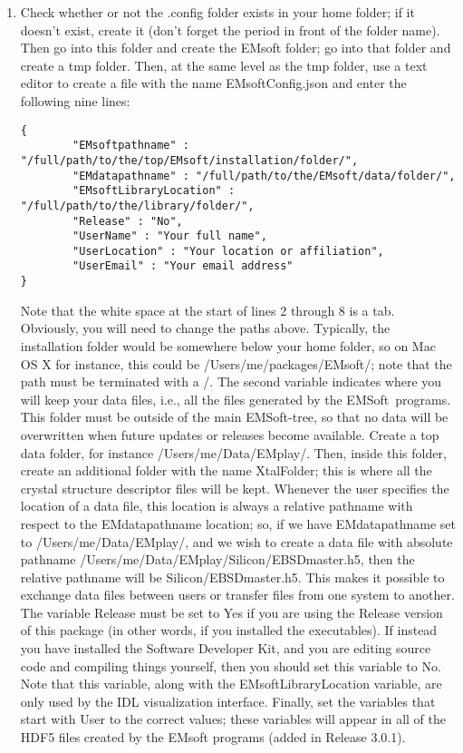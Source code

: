 \documentclass[DIV=calc, paper=letter, fontsize=11pt]{scrartcl}	 %
\newcommand{\ctp}{\textsf{EMSoft}}
\begin{document}
\begin{enumerate}
\item Check whether or not the \textsf{.config} folder exists in your home folder; if it doesn't exist, create it (don't forget the 
period in front of the folder name). Then go into this folder and create the \textsf{EMsoft} folder; go into
that folder and create a \textsf{tmp} folder.  Then, at the same level as the tmp folder, use a text editor to
create a file with the name \textsf{EMsoftConfig.json} and enter the following nine lines:
\begin{verbatim}
{
        "EMsoftpathname" : "/full/path/to/the/top/EMsoft/installation/folder/",
        "EMdatapathname" : "/full/path/to/the/EMsoft/data/folder/",
        "EMsoftLibraryLocation" : "/full/path/to/the/library/folder/",
        "Release" : "No",
        "UserName" : "Your full name",
        "UserLocation" : "Your location or affiliation",
        "UserEmail" : "Your email address"
}
\end{verbatim}
Note that the white space at the start of lines 2 through 8 is a tab.  Obviously, you will need to change the paths above.
Typically, the installation folder would be somewhere below your home folder, so on Mac OS X for instance, this 
could be \textsf{/Users/me/packages/EMsoft/};  note that the path must be terminated with a \textsf{/}.
The second variable indicates where you will keep your data files, i.e., all the files generated by the \ctp\ programs.
This folder must be outside of the main \ctp-tree, so that no data will be overwritten when future updates or releases
become available.  Create a top data folder, for instance \textsf{/Users/me/Data/EMplay/}.  Then, inside this folder,
create an additional folder with the name \textsf{XtalFolder}; this is where all the crystal structure descriptor files 
will be kept.  Whenever the user specifies the location of a data file, this location is always a relative pathname
with respect to the \textsf{EMdatapathname} location;  so, if we have \textsf{EMdatapathname} set to \textsf{/Users/me/Data/EMplay/},
and we wish to create a data file with absolute pathname \textsf{/Users/me/Data/EMplay/Silicon/EBSDmaster.h5}, then
the relative pathname will be \textsf{Silicon/EBSDmaster.h5}.  This makes it possible to exchange data files 
between users or transfer files from one system to another.  The variable \textsf{Release} must be set to \textsf{Yes} if you are 
using the Release version of this package (in other words, if you installed the executables).  If instead you have installed the 
Software Developer Kit, and you are editing source code and compiling things yourself, then you should set this variable to \textsf{No}.  Note that this variable,
along with the \textsf{EMsoftLibraryLocation} variable,  are only used by the IDL visualization interface.  
Finally, set the variables that start with \textsf{User} to the correct values; these 
variables will appear in all of the HDF5 files created by the \textsf{EMsoft} programs (added in Release 3.0.1).


\end{enumerate}
\end{document}
